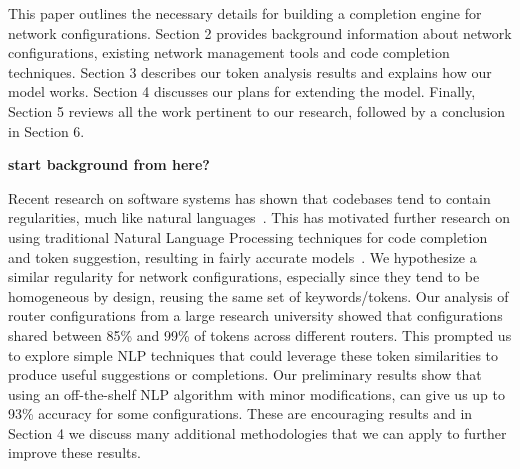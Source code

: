 This paper outlines the necessary details for building a completion engine for network configurations. Section 2 provides background information about network configurations, existing network management tools and code completion techniques. Section 3 describes our token analysis results and explains how our model works. Section 4 discusses our plans for extending the model. Finally, Section 5 reviews all the work pertinent to our research, followed by a conclusion in Section 6.

\textbf{start background from here?}





Recent research on software systems has shown that codebases tend to contain regularities, much like natural languages~\cite{naturalness}. This has motivated further research on using traditional Natural Language Processing techniques for code completion and token suggestion, resulting in fairly accurate models~\cite{naturalness, raychev}. We hypothesize a similar regularity for network configurations, especially since they tend to be homogeneous by design, reusing the same set of keywords/tokens. Our analysis of router configurations from a large research university showed that configurations shared between 85\% and 99\% of tokens across different routers. This prompted us to explore simple NLP techniques that could leverage these token similarities to produce useful suggestions or completions. Our preliminary results show that using an off-the-shelf NLP algorithm with minor modifications, can give us up to 93\% accuracy for some configurations. These are encouraging results and in Section 4 we discuss many additional methodologies that we can apply to further improve these results.
